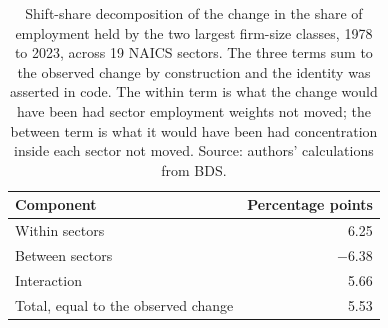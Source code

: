 \begin{table}[H]
\caption{Shift-share decomposition of the change in the share of employment held by the two
largest firm-size classes, 1978 to 2023, across 19 NAICS sectors. The three terms sum to the
observed change by construction and the identity was asserted in code. The within term is
what the change would have been had sector employment weights not moved; the between term
is what it would have been had concentration inside each sector not moved. Source: authors'
calculations from BDS.}
\label{tab:shiftshare}
\begin{tabular}{lr}
\toprule
Component & Percentage points \\
\midrule
Within sectors & $\phantom{-}$6.25 \\
Between sectors & $-$6.38 \\
Interaction & $\phantom{-}$5.66 \\
\midrule
Total, equal to the observed change & $\phantom{-}$5.53 \\
\bottomrule
\end{tabular}
\end{table}
